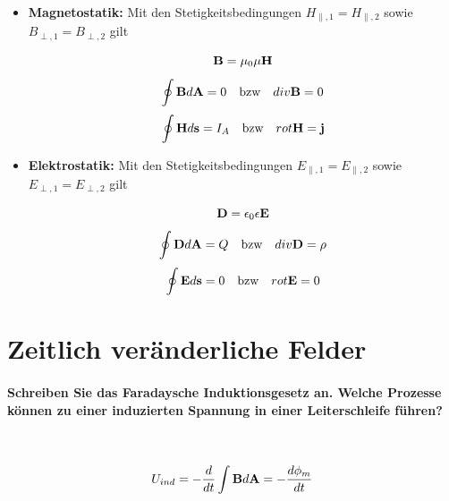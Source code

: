\documentclass[a4paper, 11pt, parskip=half]{scrartcl}
\begin{document}
\begin{itemize}
    \item \textbf{Magnetostatik:} Mit den Stetigkeitsbedingungen $H_{\parallel,1} = H_{\parallel,2}$
        sowie $B_{\perp,1} = B_{\perp,2}$ gilt
        
        \begin{equation}
            \bold{B} = \mu_0 \mu \bold{H}
        \end{equation}
        \begin{equation}
            \oint \bold{B} d\bold{A} = 0 ~~~ \text{bzw} ~~~ div \bold{B} = 0
        \end{equation}
        \begin{equation}
            \oint \bold{H} d\bold{s} = I_A ~~~ \text{bzw} ~~~ rot \bold{H} = \bold{j}
        \end{equation}
        
    \item \textbf{Elektrostatik:} Mit den Stetigkeitsbedingungen $E_{\parallel,1} = E_{\parallel,2}$
        sowie $E_{\perp,1} = E_{\perp,2}$ gilt
        
        \begin{equation}
            \bold{D} = \epsilon_0 \epsilon \bold{E}
        \end{equation}
        \begin{equation}
            \oint \bold{D} d\bold{A} = Q ~~~ \text{bzw} ~~~ div \bold{D} = \rho
        \end{equation}
        \begin{equation}
            \oint \bold{E} d\bold{s} = 0 ~~~ \text{bzw} ~~~ rot \bold{E} = 0
        \end{equation}
\end{itemize}

\newpage

\section{Zeitlich veränderliche Felder}

\paragraph{Schreiben Sie das Faradaysche Induktionsgesetz an. Welche Prozesse können zu einer
induzierten Spannung in einer Leiterschleife führen?} ~

\begin{equation}
    U_{ind} = - \frac{d}{dt} \int \bold{B} d\bold{A} = - \frac{d \phi_m}{dt}
\end{equation}
\end{document}
